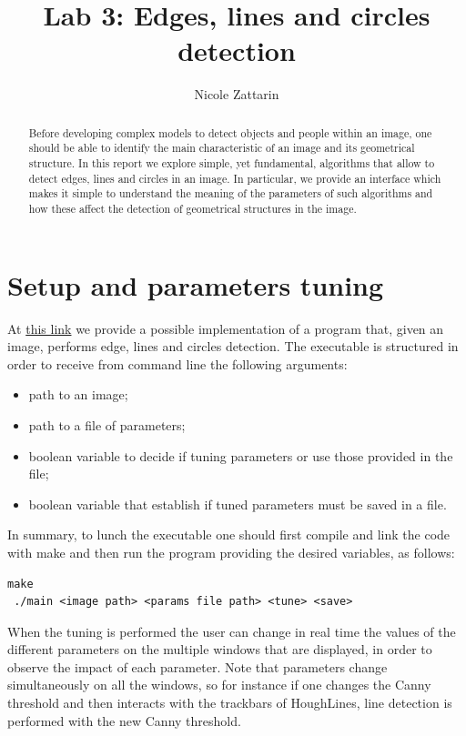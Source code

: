 \documentclass[twoside,onecolumn]{article}
\title{Lab 3: Edges, lines and circles detection } %
\author{Nicole Zattarin}
\date{}
\theoremstyle{definition}
\begin{document}
\maketitle

\begin{abstract}
Before developing complex models to detect objects and people within an image, one should be able to identify the main characteristic of an image and its geometrical structure. In this report we explore simple, yet fundamental, algorithms that allow to detect edges, lines and circles in an image. In particular, we provide an interface which makes it simple to understand the meaning of the parameters of such algorithms and how these affect the detection of geometrical structures in the image.
\end{abstract}
\section{Setup and parameters tuning}

At \href{https://github.com/nicolezattarin/Computer-Vision/tree/main/edge_detection}{this link} we provide a possible implementation of a program that, given an image, performs edge, lines and circles detection. The executable is structured in order to receive from command line the following arguments:
\begin{itemize}
\item path to an image;
\item path to a file of parameters;
\item boolean variable to decide if tuning parameters or use those provided in the file;
\item boolean variable that establish if tuned parameters must be saved in a  file.
\end{itemize}
In summary, to lunch the executable one should first compile and link the code with make and then run the program providing the desired variables, as follows:
\begin{verbatim}
make
 ./main <image path> <params file path> <tune> <save> 
 \end{verbatim}
 When the tuning is performed the user can change in real time the values of the different parameters on the multiple windows that are displayed, in order to observe the impact of each parameter. Note that parameters change simultaneously on all the windows, so for instance if one changes the Canny threshold and then interacts with the trackbars of HoughLines, line detection is performed with the new Canny threshold.
 
\end{document}
